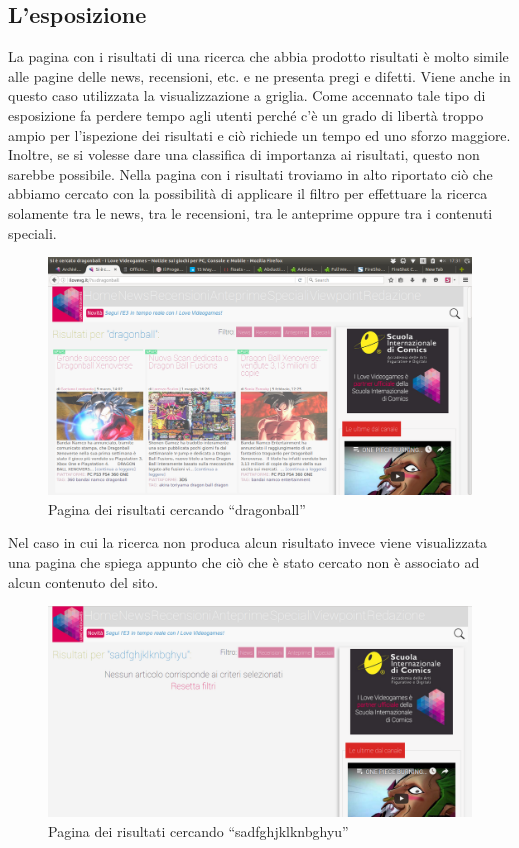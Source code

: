 \documentclass[../ProgettoTecWeb2.tex]{subfiles}
\begin{document}
	\subsection{L'esposizione}
	La pagina con i risultati di una ricerca che abbia prodotto risultati è molto simile alle pagine delle news, recensioni, etc. e ne presenta pregi e difetti. 
	Viene anche in questo caso utilizzata la visualizzazione a griglia. Come accennato tale tipo di esposizione fa perdere tempo agli utenti perché c'è un grado di libertà troppo ampio per l'ispezione dei risultati e ciò richiede un tempo ed uno sforzo maggiore. Inoltre, se si volesse dare una classifica di importanza ai risultati, questo non sarebbe possibile.
	Nella pagina con i risultati troviamo in alto riportato ciò che abbiamo cercato con la possibilità di applicare il filtro per effettuare la ricerca solamente tra le news, tra le recensioni, tra le anteprime oppure tra i contenuti speciali.
	\begin{figure} [H]
		\centering
		\includegraphics[scale=0.2]{img/RicercaConRisultati}
		\caption{Pagina dei risultati cercando ``dragonball''}
	\end{figure}

	Nel caso in cui la ricerca non produca alcun risultato invece viene visualizzata una pagina che spiega appunto che ciò che è stato cercato non è associato ad alcun contenuto del sito.
	\begin{figure} [H]
		\centering
		\includegraphics[scale=0.2]{img/RicercaNoRisultati}
		\caption{Pagina dei risultati cercando ``sadfghjklknbghyu''}
	\end{figure}
\end{document}
